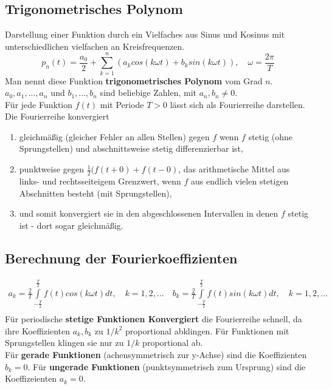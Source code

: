 \documentclass[12pt]{article}
\begin{document}
\subsection{Trigonometrisches Polynom}
Darstellung einer Funktion durch ein Vielfaches aus Sinus und Kosinus mit unterschiedlichen vielfachen an Kreisfrequenzen.
\begin{equation*}
	p_n(t)=\frac{a_0}{2}+\sum\limits_{k=1}^n(a_kcos(k\omega t)+b_ksin(k\omega t)), \quad \omega=\frac{2\pi}{T}
\end{equation*}
Man nennt diese Funktion \textbf{trigonometrisches Polynom} vom Grad $n$. $a_0,a_1,...,a_n$ und $b_1,...,b_n$ sind beliebige Zahlen, mit $a_n, b_n \neq 0$.\\
Für jede Funktion $f(t)$ mit Periode $T>0$ lässt sich als Fourierreihe darstellen.\\
Die Fourierreihe konvergiert
\begin{enumerate}
	\item gleichmäßig (gleicher Fehler an allen Stellen) gegen $f$ wenn $f$ stetig (ohne Sprungstellen) und abschnittsweise stetig differenzierbar ist,
	\item punktweise gegen $\frac{1}{2}(f(t+0)+f(t-0)$, das arithmetische Mittel aus links- und rechtsseiteigem Grenzwert, wenn $f$ aus endlich vielen stetigen Abschnitten besteht (mit Sprungstellen),
	\item und somit konvergiert sie in den abgeschlossenen Intervallen in denen $f$ stetig ist - dort sogar gleichmäßig.
\end{enumerate}
\subsection{Berechnung der Fourierkoeffizienten}
\begin{gather*}
	a_k=\frac{2}{T}\int\limits_{-\frac{T}{2}}^{\frac{T}{2}}f(t)cos(k\omega t)dt, \quad k=1,2,...\quad
	b_k=\frac{2}{T}\int\limits_{-\frac{T}{2}}^{\frac{T}{2}}f(t)sin(k\omega t)dt, \quad k=1,2,...\\
\end{gather*}
Für periodische \textbf{stetige Funktionen Konvergiert} die Fourierreihe schnell, da ihre Koeffizienten $a_k,b_k$ zu $1/k^2$ proportional abklingen. Für Funktionen mit Sprungstellen klingen sie nur zu $1/k$ proportional ab.\\
Für \textbf{gerade Funktionen} (achensymmetrisch zur y-Achse) sind die Koeffizienten $b_k = 0$. Für \textbf{ungerade Funktionen} (punktsymmetrisch zum Ursprung) sind die Koeffizeienten $a_k = 0$.
\end{document}
